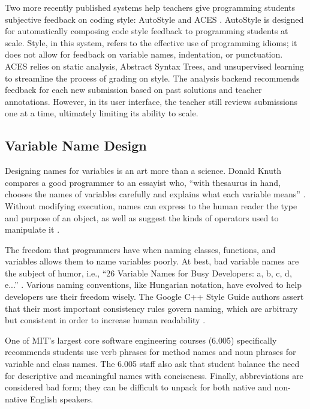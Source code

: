 Two more recently published systems help teachers give programming students subjective feedback on coding style: AutoStyle \cite{autostyle} and ACES \cite{ACES}. AutoStyle is designed for automatically composing code style feedback to programming students at scale. Style, in this system, refers to the effective use of programming idioms; it does not allow for feedback on variable names, indentation, or punctuation. ACES relies on static analysis, Abstract Syntax Trees, and unsupervised learning to streamline the process of grading on style. The analysis backend recommends feedback for each new submission based on past solutions and teacher annotations. However, in its user interface, the teacher still reviews submissions one at a time, ultimately limiting its ability to scale.



\subsection{Variable Name Design}
Designing names for variables is an art more than a science. Donald Knuth compares a good programmer to an essayist who, ``with thesaurus in hand, chooses the names of variables carefully and explains what each variable means'' \cite{literateprogramming}. Without modifying execution, names can express to the human reader the type and purpose of an object, as well as suggest the kinds of operators used to manipulate it \cite{operands}.

The freedom that programmers have when naming classes, functions, and variables allows them to name variables poorly. At best, bad variable names are the subject of humor, i.e., ``26 Variable Names for Busy Developers: a, b, c, d, e...'' \cite{hackeronion}. Various naming conventions, like Hungarian notation, have evolved to help developers use their freedom wisely. The Google C++ Style Guide authors assert that their most important consistency rules govern naming, which are arbitrary but consistent in order to increase human readability \cite{GoogleCStyleGuide}. 

One of MIT's largest core software engineering courses (6.005) \cite{UseGoodNames6.005CodeReviewReading} specifically recommends students use verb phrases for method names and noun phrases for variable and class names. The 6.005 staff also ask that student balance the need for descriptive and meaningful names with conciseness. Finally, abbreviations are considered bad form; they can be difficult to unpack for both native and non-native English speakers.

